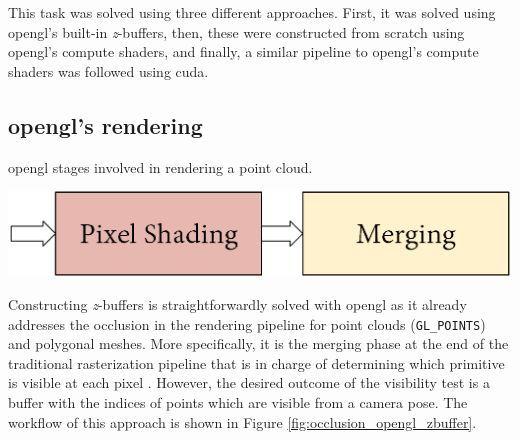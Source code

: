 This task was solved using three different approaches. First, it was solved using \acrshort{opengl}'s built-in \textit{z}-buffers, then, these were constructed from scratch using \acrshort{opengl}'s compute shaders, and finally, a similar pipeline to \acrshort{opengl}'s compute shaders was followed using \acrshort{cuda}.

\newcommand{\Points}{\textrm{P}\textsubscript{\acrshort{gpu}}}
\newcommand{\Viewpoints}{\textrm{V}\textsubscript{\acrshort{cpu}}}
\newcommand{\Space}{\hspace{1mm}}
\newcommand{\Zbuffer}{z\textrm{-buffer}\textsubscript{GPU}}
\newcommand{\ZbufferCPU}{z\textrm{-buffer}\textsubscript{CPU}}
\newcommand{\Indices}{\textrm{indices}\textsubscript{\acrshort{gpu}}}
\newcommand{\Codes}{\textrm{codes}\textsubscript{\acrshort{gpu}}}
\newcommand{\PCCardinality}{|\Points|}
\newcommand{\LeftPoints}{\textrm{n}_\textsubscript{left}}
\newcommand{\CurrentPoints}{\textrm{n}_\textsubscript{current}}
\newcommand{\MaxPoints}{\textrm{n}_\textsubscript{max}}
\newcommand{\NumGroups}{\textrm{n}_\textsubscript{groups}}
\newcommand{\Pointa}{\textrm{p}\textsubscript{3D}}
\newcommand{\Pointb}{\textrm{p}\textsubscript{2D}}

\subsection{\acrshort{opengl}'s rendering}

\begin{marginfigure}[.cm]
    \caption{\acrshort{opengl} stages involved in rendering a point cloud.}
    \label{fig:occlusion_opengl_zbuffer_core}
    \includegraphics[width=\linewidth]{figs/multi_thermal_projection/occlusion_opengl_core.png}
\end{marginfigure}
Constructing \textit{z}-buffers is straightforwardly solved with \acrshort{opengl} as it already addresses the occlusion in the rendering pipeline for point clouds (\verb|GL_POINTS|) and polygonal meshes. More specifically, it is the merging phase at the end of the traditional rasterization pipeline that is in charge of determining which primitive is visible at each pixel \cite{akenine-moller_real-time_2018}. However, the desired outcome of the visibility test is a buffer with the indices of points which are visible from a camera pose. The workflow of this approach is shown in Figure \ref{fig:occlusion_opengl_zbuffer}.

